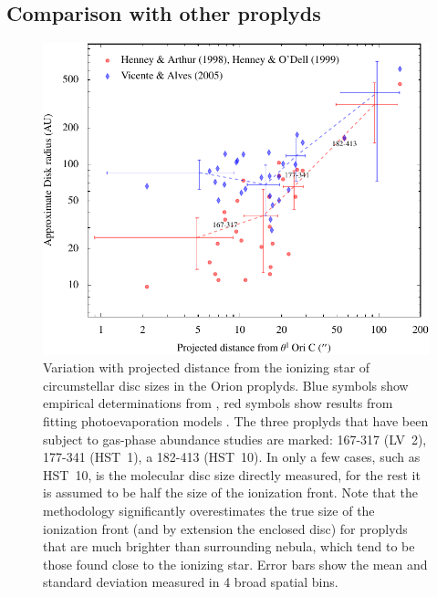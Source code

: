 \documentclass[useAMS,usenatbib]{mn2e}
\begin{document}
\addtocounter{section}{4}
\addtocounter{subsection}{2}
\addtocounter{table}{4}
\addtocounter{figure}{11}

\subsection{Comparison with other proplyds}
\begin{figure}
  \centering
  \includegraphics[width=\linewidth]{prop-size-2012}
  \caption{Variation with projected distance from the ionizing star of circumstellar disc sizes in the Orion proplyds.   Blue symbols show empirical determinations from \citet{Vicente:2005}, red symbols show results from fitting photoevaporation models \citep{Henney:1998, 1999AJ....118.2350H}.   The three proplyds that have been subject to gas-phase abundance studies are marked: 167-317 (LV~2), 177-341 (HST~1), a 182-413 (HST~10).   In only a few cases, such as HST~10, is the molecular disc size directly measured, for the rest it is assumed to be half the size of the ionization front.   Note that the \citeauthor{Vicente:2005} methodology significantly overestimates the true size of the ionization front (and by extension the enclosed disc) for proplyds that are much brighter than surrounding nebula, which tend to be those found close to the ionizing star.   Error bars show the mean and standard deviation measured in 4 broad spatial bins.}
  \label{fig:sizes}
\end{figure}
\end{document}
